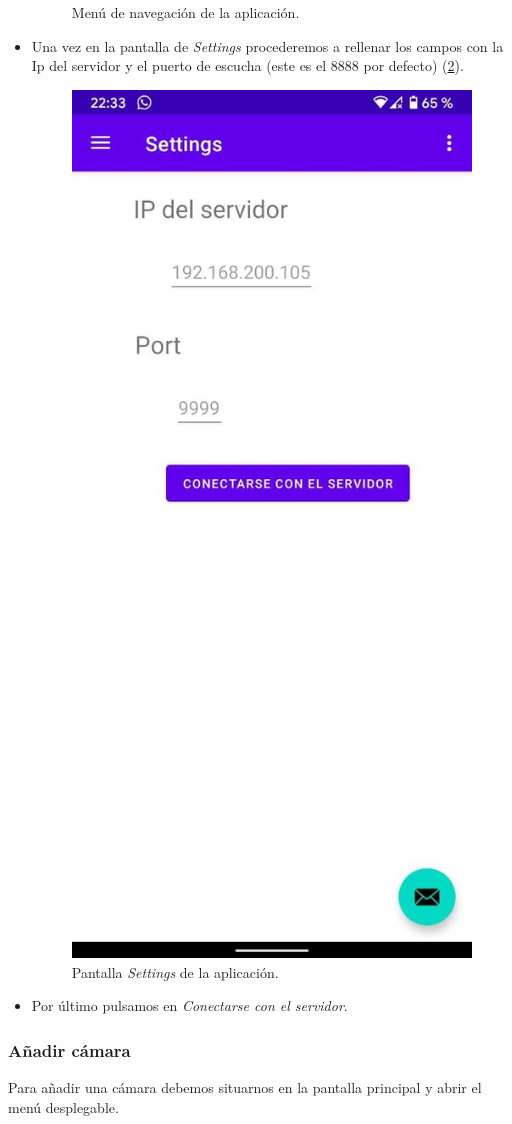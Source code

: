 \begin{itemize}
\begin{figure}[h!]
	\caption{Menú de navegación de la aplicación.}
	\label{fig:appmanual2}
\end{figure}
\item
	Una vez en la pantalla de \textit{Settings} procederemos a rellenar los campos con la Ip del servidor y el puerto de escucha (este es el 8888 por defecto) (\ref{fig:appmanual3}).
\begin{figure}[h!]
	\centering
	\includegraphics[width=0.35\linewidth]{img/manualuse1}
	\caption{Pantalla \textit{Settings} de la aplicación.}
	\label{fig:appmanual3}
\end{figure}
\item
	Por último pulsamos en \textit{Conectarse con el servidor}.
\end{itemize}

\subsubsection{Añadir cámara}

Para añadir una cámara debemos situarnos en la pantalla principal y abrir el menú desplegable.


